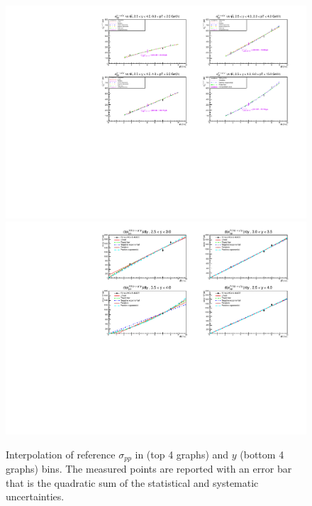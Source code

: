 \begin{figure}[!b]
\begin{center}
\includegraphics[width=0.95\linewidth]{Chapters/Analysis/Figs/sigmapp_vs_pt.pdf}
\includegraphics[width=0.95\linewidth]{Chapters/Analysis/Figs/sigmapp_vs_y.pdf}
\caption{Interpolation of reference $\sigma_{pp}$ in \pt (top 4 graphs) and $y$ (bottom 4 graphs) bins. The measured points are reported with an error bar that is the quadratic sum of the statistical and systematic uncertainties.}
\label{fig:sigmapp}
\end{center}
\end{figure}

